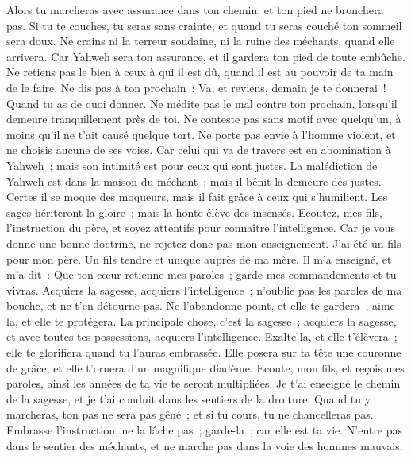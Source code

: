 \begin{multicols}{2}
Alors tu marcheras avec assurance dans ton chemin, et ton pied ne bronchera pas.
Si tu te couches, tu seras sans crainte, et quand tu seras couché ton sommeil sera doux.
Ne crains ni la terreur soudaine, ni la ruine des méchants, quand elle arrivera.
Car Yahweh sera ton assurance, et il gardera ton pied de toute embûche.
Ne retiens pas le bien à ceux à qui il est dû, quand il est au pouvoir de ta main de le faire.
Ne dis pas à ton prochain~: Va, et reviens, demain je te donnerai~! Quand tu as de quoi donner.
Ne médite pas le mal contre ton prochain, lorsqu'il demeure tranquillement près de toi.
Ne conteste pas sans motif avec quelqu'un, à moins qu'il ne t'ait causé quelque tort.
Ne porte pas envie à l'homme violent, et ne choisis aucune de ses voies.
Car celui qui va de travers est en abomination à Yahweh~; mais son intimité est pour ceux qui sont justes.
La malédiction de Yahweh est dans la maison du méchant~; mais il bénit la demeure des justes.
Certes il se moque des moqueurs, mais il fait grâce à ceux qui s'humilient.
Les sages hériteront la gloire~; mais la honte élève des insensés.
\VerseOne{}Ecoutez, mes fils, l'instruction du père, et soyez attentifs pour connaître l'intelligence.
Car je vous donne une bonne doctrine, ne rejetez donc pas mon enseignement.
J'ai été un fils pour mon père. Un fils tendre et unique auprès de ma mère.
Il m'a enseigné, et m'a dit~: Que ton cœur retienne mes paroles~; garde mes commandements et tu vivras.
Acquiers la sagesse, acquiers l'intelligence~; n'oublie pas les paroles de ma bouche, et ne t'en détourne pas.
Ne l'abandonne point, et elle te gardera~; aime-la, et elle te protégera.
La principale chose, c'est la sagesse~; acquiers la sagesse, et avec toutes tes possessions, acquiers l'intelligence.
Exalte-la, et elle t'élèvera~; elle te glorifiera quand tu l'auras embrassée.
Elle posera sur ta tête une couronne de grâce, et elle t'ornera d'un magnifique diadème.
Ecoute, mon fils, et reçois mes paroles, ainsi les années de ta vie te seront multipliées.
Je t'ai enseigné le chemin de la sagesse, et je t'ai conduit dans les sentiers de la droiture.
Quand tu y marcheras, ton pas ne sera pas gêné~; et si tu cours, tu ne chancelleras pas.
Embrasse l'instruction, ne la lâche pas~; garde-la~; car elle est ta vie.
N'entre pas dans le sentier des méchants, et ne marche pas dans la voie des hommes mauvais.

\end{multicols}
